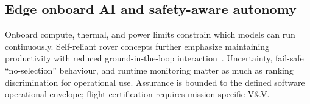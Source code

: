 \subsection{Edge onboard AI and safety-aware autonomy}
Onboard compute, thermal, and power limits constrain which models can run continuously.
Self-reliant rover concepts further emphasize maintaining productivity with reduced
ground-in-the-loop interaction~\citep{gaines2020srr}.
Uncertainty, fail-safe ``no-selection'' behaviour, and runtime monitoring matter as much as
ranking discrimination for operational use.
\newpage
Assurance is bounded to the defined software operational envelope; flight certification
requires mission-specific V\&V.
